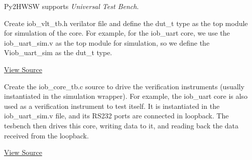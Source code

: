 %

Py2HWSW supports \textit{Universal Test Bench}.

Create iob\_vlt\_tb.h verilator file and define the dut\_t type as the top module for simulation of the core.
For example, for the iob\_uart core, we use the iob\_uart\_sim.v as the top module for simulation, so we define the Viob\_uart\_sim as the dut\_t type.

\href{https://github.com/IObundle/py2hwsw/blob/main/py2hwsw/lib/peripherals/iob_uart/hardware/simulation/src/iob_vlt_tb.h}{View Source}

Create the iob\_core\_tb.c source to drive the verification instruments (usually instantiated in the simulation wrapper).
For example, the iob\_uart core is also used as a verification instrument to test itself. It is instantiated in the iob\_uart\_sim.v file, and its RS232 ports are connected in loopback. The tesbench then drives this core, writing data to it, and reading back the data received from the loopback.

\href{https://github.com/IObundle/py2hwsw/blob/main/py2hwsw/lib/peripherals/iob_uart/hardware/simulation/src/iob_core_tb.c}{View Source}
